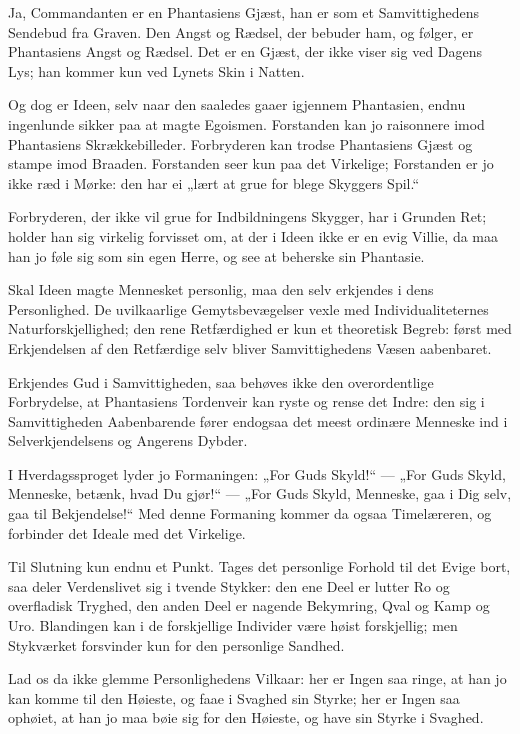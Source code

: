 \documentclass[12pt,a4paper]{book}
\newcommand{\apage}[1]{\marginnote{\footnotesize\textit{[#1]}}}
\begin{document}
Ja, Commandanten er en Phantasiens Gjæst, han er som et Samvittighedens
Sendebud fra Graven. Den Angst og Rædsel, der bebuder ham, og følger, er
Phantasiens Angst og Rædsel. Det er en Gjæst, der ikke viser sig ved
Dagens Lys; han kommer kun ved Lynets Skin i \apage{130} Natten.

Og dog er Ideen, selv naar den saaledes gaaer igjennem Phantasien, endnu
ingenlunde sikker paa at magte Egoismen. Forstanden kan jo raisonnere
imod Phantasiens Skrækkebilleder. Forbryderen kan trodse Phantasiens
Gjæst og stampe imod Braaden. Forstanden seer kun paa det Virkelige;
Forstanden er jo ikke ræd i Mørke: den har ei „lært at grue for blege
Skyggers Spil.“

Forbryderen, der ikke vil grue for Indbildningens Skygger, har i Grunden
Ret; holder han sig virkelig forvisset om, at der i Ideen ikke er en
evig Villie, da maa han jo føle sig som sin egen Herre, og see at
beherske sin Phantasie.

Skal Ideen magte Mennesket personlig, maa den selv erkjendes i dens
Personlighed. De uvilkaarlige Gemytsbevægelser vexle med
Individualiteternes Naturforskjellighed; den rene Retfærdighed er kun et
theoretisk Begreb: først med Erkjendelsen af den Retfærdige selv bliver
Samvittighedens Væsen aabenbaret.

Erkjendes Gud i Samvittigheden, saa behøves ikke den overordentlige
Forbrydelse, at Phantasiens Tordenveir kan ryste og rense det Indre: den
sig i Samvittigheden Aabenbarende fører endogsaa det meest ordinære
Menneske ind i Selverkjendelsens og Angerens Dybder.

I Hverdagssproget lyder jo Formaningen: „For Guds Skyld!“ — „For Guds
Skyld, Menneske, betænk, hvad Du gjør!“ — „For Guds Skyld, Menneske, gaa
i Dig selv, gaa til Bekjendelse!“ Med denne Formaning kommer da ogsaa
Timelæreren, og forbinder det Ideale med det Virkelige.

Til Slutning kun endnu et Punkt. Tages det personlige Forhold til det
Evige bort, saa deler Verdenslivet sig i tvende Stykker: den ene Deel er
lutter Ro og overfladisk Tryghed, den anden Deel er nagende Bekymring,
Qval og Kamp og Uro. Blandingen kan i de forskjellige Individer være
høist forskjellig; men Stykværket forsvinder kun for den personlige
Sandhed.
 \apage{131}

Lad os da ikke glemme Personlighedens Vilkaar: her er Ingen saa ringe, at
han jo kan komme til den Høieste, og faae i Svaghed sin Styrke; her er
Ingen saa ophøiet, at han jo maa bøie sig for den Høieste, og have sin
Styrke i Svaghed.
\end{document}
